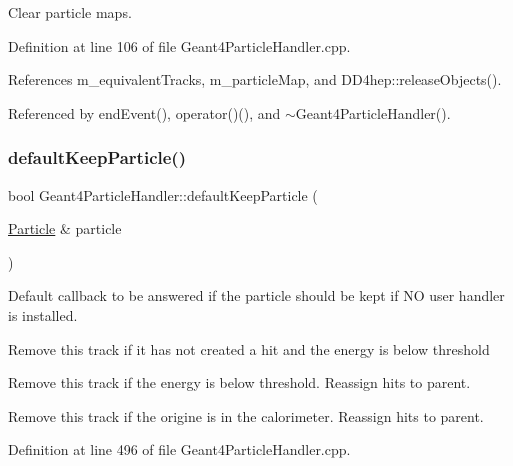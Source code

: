 Clear particle maps. 



Definition at line 106 of file Geant4\+Particle\+Handler.\+cpp.



References m\+\_\+equivalent\+Tracks, m\+\_\+particle\+Map, and D\+D4hep\+::release\+Objects().



Referenced by end\+Event(), operator()(), and $\sim$\+Geant4\+Particle\+Handler().

\hypertarget{class_d_d4hep_1_1_simulation_1_1_geant4_particle_handler_a1d0fdcaf979ddb882519706a3963f54f}{}\label{class_d_d4hep_1_1_simulation_1_1_geant4_particle_handler_a1d0fdcaf979ddb882519706a3963f54f} 
\subsubsection{\texorpdfstring{default\+Keep\+Particle()}{defaultKeepParticle()}}
{\footnotesize\ttfamily bool Geant4\+Particle\+Handler\+::default\+Keep\+Particle (\begin{DoxyParamCaption}\item[{\hyperlink{class_d_d4hep_1_1_simulation_1_1_geant4_particle_handler_a69214f487c50f6fd550571f37e715117}{Particle} \&}]{particle }\end{DoxyParamCaption})\hspace{0.3cm}{\ttfamily [static]}}



Default callback to be answered if the particle should be kept if NO user handler is installed. 

Remove this track if it has not created a hit and the energy is below threshold

Remove this track if the energy is below threshold. Reassign hits to parent.

Remove this track if the origine is in the calorimeter. Reassign hits to parent. 

Definition at line 496 of file Geant4\+Particle\+Handler.\+cpp.



